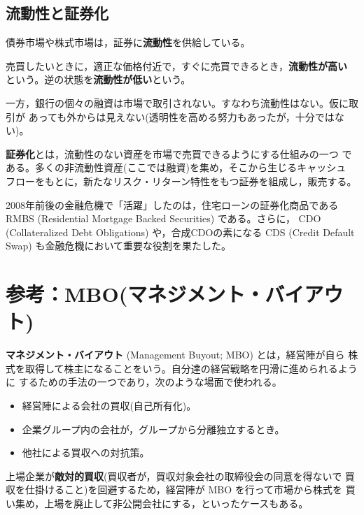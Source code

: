\subsection{流動性と証券化}

債券市場や株式市場は，証券に\textbf{流動性}を供給している。

\begin{definition}[流動性]
売買したいときに，適正な価格付近で，すぐに売買できるとき，\textbf{流動性が高い}
という。逆の状態を\textbf{流動性が低い}という。
\end{definition}

一方，銀行の個々の融資は市場で取引されない。すなわち流動性はない。仮に取引が
あっても外からは見えない(透明性を高める努力もあったが，十分ではない)。

\begin{definition}[証券化]
\textbf{証券化}とは，流動性のない資産を市場で売買できるようにする仕組みの一つ
である。多くの非流動性資産(ここでは融資)を集め，そこから生じるキャッシュ
フローをもとに，新たなリスク・リターン特性をもつ証券を組成し，販売する。
\end{definition}

2008年前後の金融危機で「活躍」したのは，住宅ローンの証券化商品である
RMBS (Residential Mortgage Backed Securities) である。さらに，
CDO (Collateralized Debt Obligations) や，合成CDOの素になる
CDS (Credit Default Swap) も金融危機において重要な役割を果たした。

\section*{参考：MBO(マネジメント・バイアウト)}

\textbf{マネジメント・バイアウト} (Management Buyout; MBO) とは，経営陣が自ら
株式を取得して株主になることをいう。自分達の経営戦略を円滑に進められるように
するための手法の一つであり，次のような場面で使われる。

\begin{itemize}
\item 経営陣による会社の買収(自己所有化)。
\item 企業グループ内の会社が，グループから分離独立するとき。
\item 他社による買収への対抗策。
\end{itemize}

上場企業が\textbf{敵対的買収}(買収者が，買収対象会社の取締役会の同意を得ないで
買収を仕掛けること)を回避するため，経営陣が MBO を行って市場から株式を
買い集め，上場を廃止して非公開会社にする，といったケースもある。
